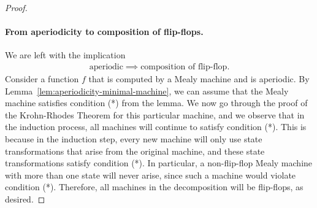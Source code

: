 \begin{proof}
    \paragraph*{From aperiodicity to composition of flip-flops.} We are left with the implication
\begin{align*}\text{aperiodic} \implies \text{composition of flip-flop}.
\end{align*}
Consider a function $f$ that is computed by a Mealy machine and is aperiodic. By Lemma~\ref{lem:aperiodicity-minimal-machine}, we can assume that the Mealy machine satisfies condition (*) from the lemma. We now go through the proof of the Krohn-Rhodes Theorem for this particular machine, and we observe that in the induction process, all machines will continue to satisfy condition (*). This is because in the induction step, every new machine will only use state transformations that arise from the original machine, and these state transformations satisfy condition (*).  In particular, a non-flip-flop Mealy machine with more than one state will never arise, since such a machine would violate condition (*). Therefore, all machines in the decomposition will be flip-flops, as desired.

\end{proof}


\exerciseheader

